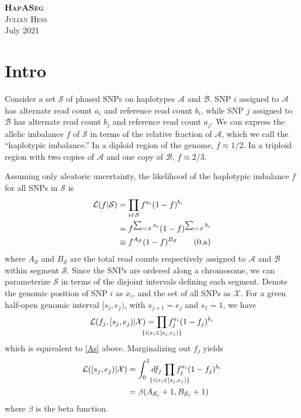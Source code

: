 \documentclass[10pt,letter]{article}
\numberwithin{equation}{section}
\newcommand{\rt}{\right}
\newcommand{\lt}{\left}
\newcommand{\btag}[1]{\addtocounter{equation}{1}\label{#1}\tag{\arabic{section}.\alph{equation}}}
\newcommand{\textop}[1]{\operatorname{#1}}
\begin{document}
\noindent\textbf{\textsc{HapASeg}}\\
\noindent\textsc{Julian Hess}\\
 July 2021\\

\section{Intro}

Consider a set $\mathcal{S}$ of phased SNPs on haplotypes $\mathcal{A}$ and $\mathcal{B}$. SNP $i$ assigned to $\mathcal{A}$ has alternate read count $a_i$ and reference read count $b_i$, while SNP $j$ assigned to $\mathcal{B}$ has alternate read count $b_j$ and reference read count $a_j$. We can express the allelic imbalance $f$ of $\mathcal{S}$ in terms of the relative fraction of $\mathcal{A}$, which we call the ``haplotypic imbalance.'' In a diploid region of the genome, $f\approx 1/2$. In a triploid region with two copies of $\mathcal{A}$ and one copy of $\mathcal{B}$, $f\approx 2/3$.

Assuming only aleatoric uncertainty, the likelihood of the haplotypic imbalance $f$ for all SNPs in $\mathcal{S}$ is
\begin{align*}
\mathcal{L}(f|\mathcal{S}) &= \prod_{i\in\mathcal{S}} f^{a_i} (1 - f)^{b_i}\\
&= f^{\sum_{i\in\mathcal{S}} a_i}(1-f)^{\sum_{i\in\mathcal{S}} b_i}\\
&\equiv f^{A_\mathcal{S}}(1-f)^{B_\mathcal{S}}\btag{As}
\end{align*}
where $A_\mathcal{S}$ and $B_\mathcal{S}$ are the total read counts respectively assigned to $\mathcal{A}$ and $\mathcal{B}$ within segment $\mathcal{S}$. Since the SNPs are ordered along a chromosome, we can parameterize $\mathcal{S}$ in terms of the disjoint intervals defining each segment. Denote the genomic position of SNP $i$ as $x_i$, and the set of all SNPs as $\mathcal{X}$. For a given half-open genomic interval $[s_j,e_j)$, with $s_{j+1}=e_j$ and $s_1=1$, we have
\begin{align*}
\mathcal{L}(f_j,[s_j,e_j)|\mathcal{X})=\prod_{\mathclap{\{i|x_i\in [s_j, e_j)\}}} f_j^{a_i}(1 - f_j)^{b_i}
\end{align*}
which is equivalent to \eqref{As} above. Marginalizing out $f_j$ yields
\begin{align*}
\mathcal{L}([s_j,e_j)|\mathcal{X})&=\int_0^1 df_j\,\prod_{\mathclap{\{i|x_i\in [s_j, e_j)\}}} f_j^{a_i}(1 - f_j)^{b_i}\\
&= \beta(A_{\mathcal{S}_j}+1, B_{\mathcal{S}_j}+1)
\end{align*}
where $\beta$ is the beta function.
\end{document}

